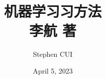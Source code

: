 \usepackage{amsmath, amssymb, amsthm}
\usepackage{ctex}
\usepackage{orcidlink}

\newtheorem{definition}{Definition}

\title{\textbf{机器学习习方法}\\李航 著}

\author{Stephen CUI}
\date{April 5, 2023}

\usepackage[
    bottom=1.77cm,
    left=2.75cm,
    right=2.75cm,
]{geometry}

\usepackage{hyperref}
\hypersetup{
    colorlinks=true,
    linkcolor=red!95!black,
    filecolor=blue,
    urlcolor=blue!85!black,
    citecolor=green,
}